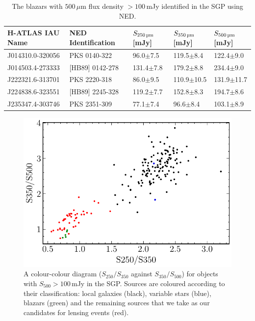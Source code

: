 \begin{table}
    \centering
    \begin{tabular}{p{3.75cm}|p{3.25cm}|p{2cm}|p{2cm}|p{2cm}}
        \hline
        \hline
        H-ATLAS IAU Name & NED Identification & $S_{\textrm{250\,\micron}}$ [mJy] & $S_{\textrm{350\,\micron}}$ [mJy] & $S_{\textrm{500\,\micron}}$ [mJy] \\
        \hline
        \hline
        J014310.0-320056 & PKS 0140-322 & 96.0$\pm$7.5 & 119.5$\pm$8.4 & 122.4$\pm$9.0 \\
        J014503.4-273333 & [HB89] 0142-278 & 131.4$\pm$7.8 & 179.2$\pm$8.8 & 234.4$\pm$9.0 \\
        J222321.6-313701 & PKS 2220-318 & 86.0$\pm$9.5 & 110.9$\pm$10.5 & 131.9$\pm$11.7 \\
        J224838.6-323551 & [HB89] 2245-328 & 119.2$\pm$7.7 & 152.8$\pm$8.3 & 194.7$\pm$8.6 \\
        J235347.4-303746 & PKS 2351-309 & 77.1$\pm$7.4 & 96.6$\pm$8.4 & 103.1$\pm$8.9 \\
        \hline
    \end{tabular}
    \caption[Blazars in the SGP with $S_{500} > 100\,$mJy]{The blazars with $500\,\mu$m flux density $> 100\,$mJy identified in the SGP using NED.}
    \label{tab:blazars}
\end{table}

\begin{figure}
    \centering
    \includegraphics[width=0.8\columnwidth]{Figures/submm_colours_lensed_candidates.pdf}
    \caption[$S_{250}/S_{350}$ against $S_{350}/S_{500}$ diagram of SGP sources with $S_{500} > 100\,$mJy]{A colour-colour diagram ($S_{250}/S_{350}$ against $S_{350}/S_{500}$) for objects with $S_{500} > 100\,$mJy in the SGP. Sources are coloured according to their classification: local galaxies (black), variable stars (blue), blazars (green) and the remaining sources that we take as our candidates for lensing events (red).}
    \label{fig:submm_colours_lensed_candidates}
\end{figure}

